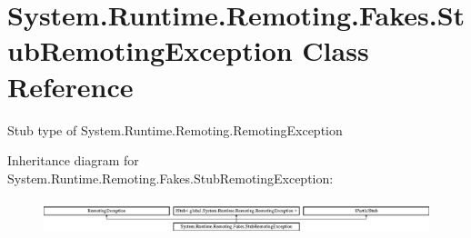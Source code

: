 \hypertarget{class_system_1_1_runtime_1_1_remoting_1_1_fakes_1_1_stub_remoting_exception}{\section{System.\-Runtime.\-Remoting.\-Fakes.\-Stub\-Remoting\-Exception Class Reference}
\label{class_system_1_1_runtime_1_1_remoting_1_1_fakes_1_1_stub_remoting_exception}
}


Stub type of System.\-Runtime.\-Remoting.\-Remoting\-Exception 


Inheritance diagram for System.\-Runtime.\-Remoting.\-Fakes.\-Stub\-Remoting\-Exception\-:\begin{figure}[H]
\begin{center}
\leavevmode
\includegraphics[height=1.028466cm]{class_system_1_1_runtime_1_1_remoting_1_1_fakes_1_1_stub_remoting_exception}
\end{center}
\end{figure}
